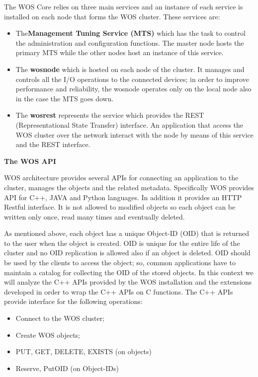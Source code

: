 The WOS Core relies on three main services and an instance of each service is installed on each node that forms the WOS cluster. These services are:
\begin{itemize}
\item The\textbf{Management Tuning Service (MTS)} which has the task to control the administration and configuration functions.
The master node hosts the primary MTS while the other nodes host an instance of this service.

\item The \textbf{wosnode} which is hosted on each node of the cluster. It manages and controls all the I/O operations to the connected devices; in order to improve performance and reliability, the wosnode operates only on the local node also in the case the MTS goes down.

\item The \textbf{wosrest} represents the service which provides the REST (Representational State Transfer) interface. An application that access the WOS cluster over the network interact with the node by means of this service and the REST interface.
\end{itemize}

\textbf{The WOS API}

WOS architecture provides several APIs for connecting an application to the cluster, manages the objects and the related metadata.
Specifically WOS provides API for C++, JAVA and Python languages.
In addition it provides an HTTP Restful interface.
It is not allowed to modified objects so each object can be written only once, read many times and eventually deleted.

As mentioned above, each object has a unique Object-ID (OID) that is returned to the user when the object is created.
OID is unique for the entire life of the cluster and no OID replication is allowed also if an object is deleted.
OID should be used by the clients to access the object; so, common applications have to maintain a catalog for collecting the OID of the stored objects.
In this context we will analyze the C++ APIs provided by the WOS installation and the extensions developed in order to wrap the C++ APIs on C functions.
The C++ APIs provide interface for the following operations:
\begin{itemize}
	\item Connect to the WOS cluster;
	\item Create WOS objects;
	\item PUT, GET, DELETE, EXISTS (on objects)
	\item Reserve, PutOID (on Object-IDs)
\end{itemize}

